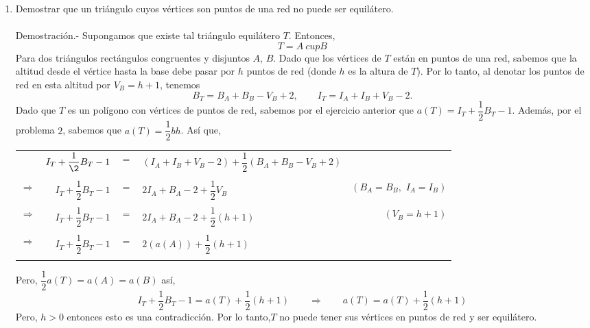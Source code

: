 \begin{enumerate}[ \bfseries 1.]
\begin{enumerate}[\bfseries (a)]
	    \end{enumerate}

	\item Demostrar que un triángulo cuyos vértices son puntos de una red no puede ser equilátero.\\\\
	Demostración.-\; Supongamos que existe tal triángulo equilátero $T$. Entonces, $$T = A \ cup B$$ 
	Para dos triángulos rectángulos congruentes y disjuntos $A$, $B$. Dado que los vértices de $T$ están en puntos de una red, sabemos que la altitud desde el vértice hasta la base debe pasar por $h$ puntos de red (donde $h$ es la altura de $T$). Por lo tanto, al denotar los puntos de red en esta altitud por $V_B = h + 1$, tenemos
	$$B_T = B_A + B_B -V_B + 2, \qquad I_T = I_A + I_B + V_B - 2.$$ 
	Dado que $T$ es un polígono con vértices de puntos de red, sabemos por el ejercicio anterior que $a(T) = I_T + \dfrac{1}{2} B_T -1$. Además, por el problema $2$, sabemos que $a(T) = \dfrac{1}{2} bh$. Así que,
	\begin{center}
	    \begin{tabular}{crclr}
		& $I_T + \dfrac{1}{\2} B_T - 1$ & $=$ & $(I_A + I_B + V_B - 2) + \dfrac{1}{2}(B_A + B_B - V_B + 2)$ &\\\\
		$\Rightarrow$ & $I_T + \dfrac{1}{2} B_T - 1$ & $=$ & $2I_A + B_A - 2 + \dfrac{1}{2} V_B$ & $(B_A=B_B, \,\, I_A=I_B)$\\\\
		$\Rightarrow$ & $I_T + \dfrac{1}{2} B_T - 1$ & $=$ & $2I_A + B_A - 2 + \dfrac{1}{2}(h+1)$ & $(V_B = h + 1)$\\\\
		$\Rightarrow$ & $I_T + \dfrac{1}{2} B_T - 1$ & $=$ & $2(a(A)) + \dfrac{1}{2}(h+1)$ &\\\\
	    \end{tabular}
	\end{center}
	Pero, $\dfrac{1}{2} a(T)=a(A)=a(B)$ así,
	$$I_T + \dfrac{1}{2} B_T - 1 = a(T) + \dfrac{1}{2}(h+1) \qquad \Rightarrow \qquad a(T)=a(T) + \dfrac{1}{2}(h+1)$$
	Pero, $h > 0$ entonces esto es una contradicción. Por lo tanto,$T$ no puede tener sus vértices en puntos de red y ser equilátero.\\\\


\end{enumerate}
